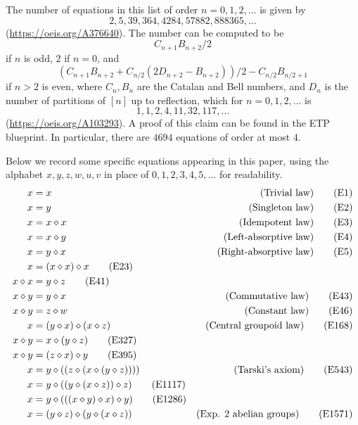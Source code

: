 The number of equations in this list of order $n=0,1,2,\dots$ is given by
$$ 2, 5, 39, 364, 4284, 57882, 888365, \dots$$
(\url{https://oeis.org/A376640}).  The number can be computed to be
$$ C_{n+1} B_{n+2}/2$$
if $n$ is odd, $2$ if $n=0$, and
$$ (C_{n+1} B_{n+2}+ C_{n/2}(2D_{n+2}-B_{n+2}))/2 - C_{n/2} B_{n/2+1}$$
if $n > 2$ is even, where $C_n, B_n$ are the Catalan and Bell numbers, and $D_n$ is the number of partitions of $[n]$ up to reflection, which for $n=0,1,2,\dots$ is
$$ 1, 1, 2, 4, 11, 32, 117, \dots$$
(\url{https://oeis.org/A103293}).  A proof of this claim can be found in the ETP blueprint.  In particular, there are $4694$ equations of order at most $4$.

Below we record some specific equations appearing in this paper, using the alphabet $x,y,z,w,u,v$ in place of $0,1,2,3,4,5,\dots$ for readability.
\begin{align}
        x &= x & \hbox{(Trivial law)} \label{eq1}\tag{E1} \\
        x &= y & \hbox{(Singleton law)} \label{eq2}\tag{E2} \\
        x &= x \op x & \hbox{(Idempotent law)} \label{eq3}\tag{E3} \\
        x &= x \op y & \hbox{(Left-absorptive law)} \label{eq4}\tag{E4} \\
        x &= y \op x & \hbox{(Right-absorptive law)} \label{eq5}\tag{E5} \\
        x &= (x \op x) \op x \label{eq23}\tag{E23} \\
        x \op x &= y \op z \label{eq41}\tag{E41} \\
        x \op y &= y \op x & \hbox{(Commutative law)} \label{eq43}\tag{E43} \\
        x \op y &= z \op w & \hbox{(Constant law)} \label{eq46}\tag{E46} \\
        x &= (y \op x) \op (x \op z) & \hbox{(Central groupoid law)} \label{eq168}\tag{E168} \\
        x \op y &= x \op (y \op z) \label{eq327}\tag{E327} \\
        x \op y &= (z \op x) \op y \label{eq395}\tag{E395} \\
        x &= y \op ( (z \op (x \op (y \op z)))) & \hbox{(Tarski's axiom)} \label{eq543}\tag{E543} \\
        x &= y \op ((y \op (x \op z)) \op z) \label{eq1117}\tag{E1117} \\
        x &= y \op (((x \op y) \op x) \op y) \label{eq1286}\tag{E1286} \\
        x &= (y \op z) \op (y \op (x \op z)) & \hbox{(Exp. $2$ abelian groups)} \label{eq1571}\tag{E1571} \\

\end{align}
